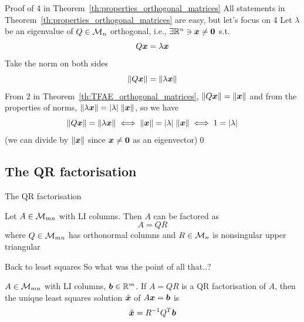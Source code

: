 \documentclass[aspectratio=169]{beamer}\usepackage[]{graphicx}\usepackage[]{xcolor}
\begin{document}
\begin{frame}{Proof of 4 in Theorem~\ref{th:properties_orthogonal_matrices}}
All statements in Theorem~\ref{th:properties_orthogonal_matrices} are easy, but let's focus on 4 
\vfill
Let $\lambda$ be an eigenvalue of $Q\in\mathcal{M}_n$ orthogonal, i.e., $\exists\IR^n\ni\bx\neq\b0$ s.t.
\[
Q\bm{x} = \lambda\bm{x}
\]
Take the norm on both sides
\[
\|Q\bm{x}\| = \|\lambda\bm{x}\|
\]
From 2 in Theorem~\ref{th:TFAE_orthogonal_matrices}, $\|Q\bm{x}\|=\|\bm{x}\|$ and from the properties of norms, $\|\lambda\bm{x}\|=|\lambda|\;\|\bm{x}\|$, so we have
\[
\|Q\bm{x}\| = \|\lambda\bm{x}\| \iff \|\bm{x}\| = |\lambda|\;\|\bm{x}\| \iff 1=|\lambda|
\]
(we can divide by $\|\bm{x}\|$ since $\bx\neq \b0$ as an eigenvector)\hfill\qed
\end{frame}



\subsection{The QR factorisation}
\begin{frame}{The QR factorisation}
\begin{theorem}\label{th:QR_factorisation}
Let $A\in\mathcal{M}_{mn}$ with LI columns. Then $A$ can be factored as
\[
A=QR
\]
where $Q\in\mathcal{M}_{mn}$ has orthonormal columns and $R\in\mathcal{M}_n$ is nonsingular upper triangular
\end{theorem}
\end{frame}


\begin{frame}{Back to least squares}
So what was the point of all that..?
\vfill
\begin{theorem}
\label{th:LSQ_with_QR}
$A\in\mathcal{M}_{mn}$ with LI columns, $\bm{b}\in\mathbb{R}^m$. If $A=QR$ is a QR factorisation of $A$, then the unique least squares solution $\tilde{\bm{x}}$ of $A\bm{x}=\bm{b}$ is
\[
\tilde{\bm{x}} = R^{-1}Q^T\bm{b}
\]
\end{theorem}
\end{frame}
\end{document}
